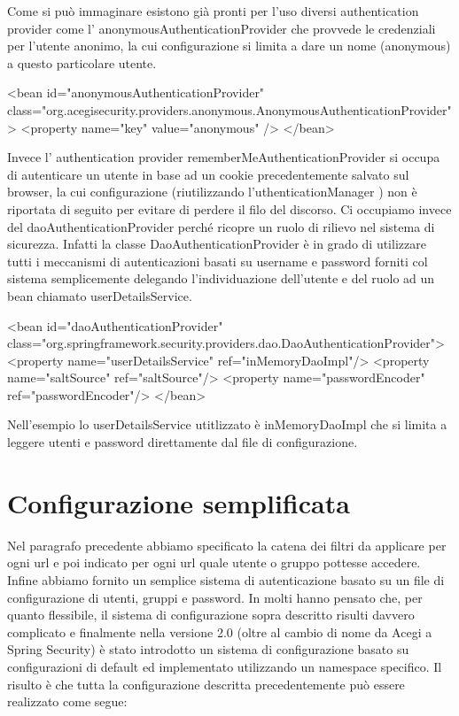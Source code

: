 Come si può immaginare esistono già pronti per l'uso diversi authentication provider come l' anonymousAuthenticationProvider che provvede le credenziali per l'utente anonimo, la cui configurazione si limita a dare un nome (anonymous)  a questo particolare utente.

\begin{xml}
<bean id="anonymousAuthenticationProvider"
    class="org.acegisecurity.providers.anonymous.AnonymousAuthenticationProvider">
  <property name="key" value="anonymous" />
</bean>
\end{xml}

Invece l' authentication provider  rememberMeAuthenticationProvider si occupa di autenticare un utente in base ad un cookie precedentemente salvato sul browser, la cui configurazione (riutilizzando l'uthenticationManager ) non è riportata di seguito per evitare di perdere il filo del discorso.
Ci occupiamo invece del  daoAuthenticationProvider  perché ricopre un ruolo di rilievo nel sistema di sicurezza. Infatti la classe  DaoAuthenticationProvider è in grado di utilizzare tutti i meccanismi di autenticazioni basati su username e password forniti col sistema semplicemente delegando l'individuazione dell'utente e del ruolo ad un bean chiamato userDetailsService.

\begin{xml}
<bean id="daoAuthenticationProvider"
  class="org.springframework.security.providers.dao.DaoAuthenticationProvider">
  <property name="userDetailsService" ref="inMemoryDaoImpl"/>
  <property name="saltSource" ref="saltSource"/>
  <property name="passwordEncoder" ref="passwordEncoder"/>
</bean>    
\end{xml}
  
Nell'esempio lo userDetailsService utitlizzato è inMemoryDaoImpl che si limita a leggere utenti e password direttamente dal file di configurazione.

\section{Configurazione semplificata}

Nel paragrafo precedente abbiamo specificato la catena dei filtri da applicare per ogni url e poi indicato per ogni url quale utente o gruppo pottesse accedere. Infine abbiamo fornito un semplice sistema di autenticazione basato su un file di configurazione di utenti, gruppi e password. In molti hanno pensato che, per quanto flessibile, il sistema di configurazione sopra descritto risulti davvero complicato e finalmente nella versione 2.0 (oltre al cambio di nome da Acegi a Spring Security) è stato introdotto un sistema di configurazione basato su configurazioni di default ed implementato utilizzando un namespace specifico. Il risulto è che tutta la configurazione descritta precedentemente può essere realizzato come segue:

